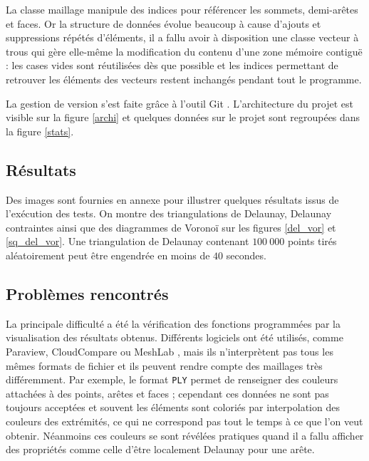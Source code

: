 \documentclass[12pt,a4paper]{report}
\begin{document}
La classe maillage manipule des indices pour référencer les sommets, demi-arêtes et faces. Or la structure de données évolue beaucoup à cause d'ajouts et suppressions répétés d'éléments, il a fallu avoir à disposition une classe \og vecteur à trous \fg{} qui gère elle-même la modification du contenu d'une zone mémoire contiguë : les cases vides sont réutilisées dès que possible et les indices permettant de retrouver les éléments des vecteurs restent inchangés pendant tout le programme.

\vspace{1cm}
La gestion de version s'est faite grâce à l'outil Git \cite{Git}.
L'architecture du projet est visible sur la figure \ref{archi} et quelques données sur le projet sont regroupées dans la figure \ref{stats}.


\subsection{Résultats}

Des images sont fournies en annexe pour illustrer quelques résultats issus de l'exécution des tests. On montre des triangulations de Delaunay, Delaunay contraintes ainsi que des diagrammes de Voronoï sur les figures \ref{del_vor} et \ref{sq_del_vor}. Une triangulation de Delaunay contenant $100\ 000$ points tirés aléatoirement peut être engendrée en moins de $40$ secondes.

\subsection{Problèmes rencontrés}

La principale difficulté a été la vérification des fonctions programmées par la visualisation des résultats obtenus. Différents logiciels ont été utilisés, comme Paraview, CloudCompare ou MeshLab \cite{Paraview, CloudCompare, MeshLab}, mais ils n'interprètent pas tous les mêmes formats de fichier et ils peuvent rendre compte des maillages très différemment. Par exemple, le format \verb+PLY+ permet de renseigner des couleurs attachées à des points, arêtes et faces ; cependant ces données ne sont pas toujours acceptées et souvent les éléments sont coloriés par interpolation des couleurs des extrémités, ce qui ne correspond pas tout le temps à ce que l'on veut obtenir. Néanmoins ces couleurs se sont révélées pratiques quand il a fallu afficher des propriétés comme celle d'être localement Delaunay pour une arête.
\end{document}
